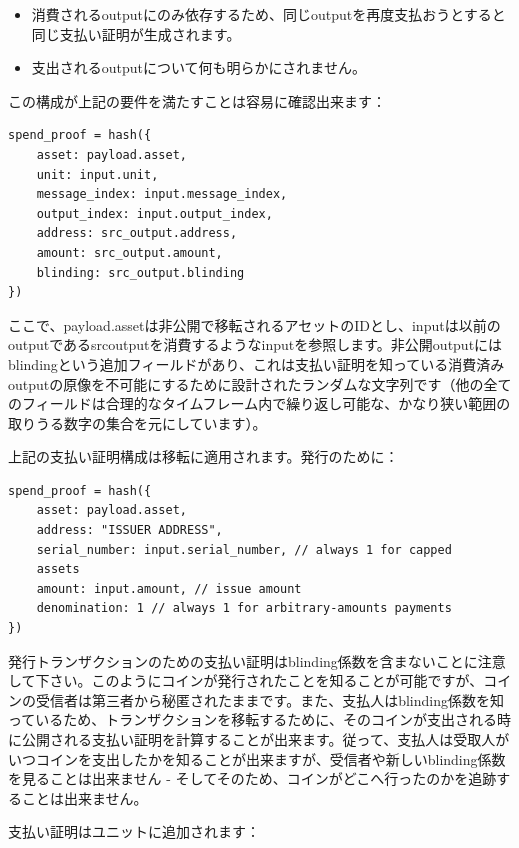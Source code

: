 \documentclass[a4paper, dvipdfmx]{jsarticle}
\begin{document}
\begin{itemize}
    \item 消費されるoutputにのみ依存するため、同じoutputを再度支払おうとすると同じ支払い証明が生成されます。
    \item 支出されるoutputについて何も明らかにされません。
\end{itemize}

この構成が上記の要件を満たすことは容易に確認出来ます：

\begin{lstlisting}[basicstyle=\ttfamily\footnotesize, frame=none]
spend_proof = hash({
    asset: payload.asset,
    unit: input.unit,
    message_index: input.message_index,
    output_index: input.output_index,
    address: src_output.address,
    amount: src_output.amount,
    blinding: src_output.blinding
})
\end{lstlisting}

\noindent ここで、payload.assetは非公開で移転されるアセットのIDとし、inputは以前のoutputであるsrc\textunderscore outputを消費するようなinputを参照します。非公開outputにはblindingという追加フィールドがあり、これは支払い証明を知っている消費済みoutputの原像を不可能にするために設計されたランダムな文字列です（他の全てのフィールドは合理的なタイムフレーム内で繰り返し可能な、かなり狭い範囲の取りうる数字の集合を元にしています）。

上記の支払い証明構成は移転に適用されます。発行のために：

\begin{lstlisting}[basicstyle=\ttfamily\footnotesize, frame=none]
spend_proof = hash({
    asset: payload.asset,
    address: "ISSUER ADDRESS",
    serial_number: input.serial_number, // always 1 for capped
    assets
    amount: input.amount, // issue amount
    denomination: 1 // always 1 for arbitrary-amounts payments
})
\end{lstlisting}

\noindent 発行トランザクションのための支払い証明はblinding係数を含まないことに注意して下さい。このようにコインが発行されたことを知ることが可能ですが、コインの受信者は第三者から秘匿されたままです。また、支払人はblinding係数を知っているため、トランザクションを移転するために、そのコインが支出される時に公開される支払い証明を計算することが出来ます。従って、支払人は受取人がいつコインを支出したかを知ることが出来ますが、受信者や新しいblinding係数を見ることは出来ません - そしてそのため、コインがどこへ行ったのかを追跡することは出来ません。

支払い証明はユニットに追加されます：
\end{document}
